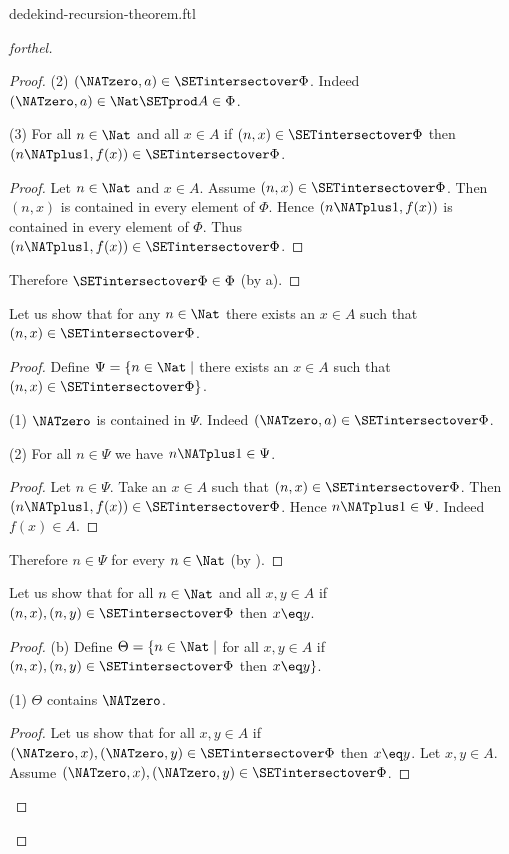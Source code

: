 \documentclass{naproche-library}
\begin{document}
\begin{smodule}[title=Dedekind's Recursion Theorem]{dedekind-recursion-theorem.ftl}
\begin{proof}[forthel]
\begin{proof}
    (2) $(\NATzero, a) \in \SETintersectover \Phi$.
    Indeed $(\NATzero, a) \in \Nat \SETprod A \in \Phi$.

    (3) For all $n \in \Nat$ and all $x \in A$ if $(n, x) \in
    \SETintersectover \Phi$ then $(n \NATplus 1, f(x)) \in \SETintersectover \Phi$.
    \begin{proof}
      Let $n \in \Nat$ and $x \in A$.
      Assume $(n, x) \in \SETintersectover \Phi$.
      Then $(n, x)$ is contained in every element of $\Phi$.
      Hence $(n \NATplus 1, f(x))$ is contained in every element of $\Phi$.
      Thus $(n \NATplus 1, f(x)) \in \SETintersectover \Phi$.
    \end{proof}

    Therefore $\SETintersectover \Phi \in \Phi$ (by a).
  \end{proof}

  Let us show that for any $n \in \Nat$ there exists an $x \in A$ such
  that $(n, x) \in \SETintersectover \Phi$.
  \begin{proof}
    Define $\Psi = \{ n \in \Nat \mid$ there exists an $x \in A$ such that
    $(n, x) \in \SETintersectover \Phi \}$.

    (1) $\NATzero$ is contained in $\Psi$.
    Indeed $(\NATzero, a) \in \SETintersectover \Phi$.

    (2) For all $n \in \Psi$ we have $n \NATplus 1 \in \Psi$.
    \begin{proof}
      Let $n \in \Psi$.
      Take an $x \in A$ such that $(n, x) \in \SETintersectover \Phi$.
      Then $(n \NATplus 1, f(x)) \in \SETintersectover \Phi$.
      Hence $n \NATplus 1 \in \Psi$.
      Indeed $f(x) \in A$.
    \end{proof}

    Therefore $n \in \Psi$ for every $n \in \Nat$ (by ).
  \end{proof}

  Let us show that for all $n \in \Nat$ and all $x, y \in A$ if
  $(n, x), (n, y) \in \SETintersectover \Phi$ then $x \eq y$.
  \begin{proof}
    (b) Define $\Theta = \{ n \in \Nat \mid$ for all $x, y \in A$ if
    $(n, x), (n, y) \in \SETintersectover \Phi$ then $x \eq y \}$.

    (1) $\Theta$ contains $\NATzero$.
    \begin{proof}
      Let us show that for all $x, y \in A$ if $(\NATzero, x), (\NATzero, y) \in
      \SETintersectover \Phi$ then $x \eq y$.
        Let $x, y \in A$.
        Assume $(\NATzero, x), (\NATzero, y) \in \SETintersectover \Phi$.


\end{proof}
\end{proof}
\end{proof}
\end{smodule}
\end{document}
